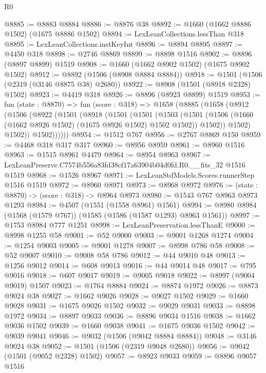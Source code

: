 \begin{lexlean}{R0}
\begin{coremodule}
@8885 := @8883 @8884
@8886 := @8876 @38
@8892 := @1660 (@1662 @8886 @1502) (@1675 @8886 @1502)
@8894 := LexLeanCollections.lessThan @318
@8895 := LexLeanCollections.instKeyInt
@8896 := @8894 @8895
@8897 := @4450 @318
@8898 := @2746 @8869
@8899 := @8898 @1516
@8902 := @8896 (@8897 @8899) @1519
@8908 := @1660 (@1662 @8902 @1502) (@1675 @8902 @1502)
@8912 := @8892 (@1506 (@8908 @8884 @8884))
@8918 := @1501 (@1506 (@2319 (@3146 @8875 @38) @2680))
@8922 := @8908 (@1501 (@8918 @2328) @1502)
@8923 := @4419 @318
@8926 := @8896 (@8923 @8899) @1519
@8953 := fun (state : @8870) =>
  fun (score : @318) =>
  @1658
    (@8885
      (@1658
        (@8912
          (@1506
            (@8922
              (@1501
                (@8918
                  (@1501
                    (@1501
                      (@1503
                        (@1501
                          (@1506 (@1660 (@1662 @8926 @1502) (@1675 @8926 @1502) @1502 @1502))
                          @1502))
                      @1502)
                    @1502))
                @1502))))))
@8954 := @1512 @767
@8956 := @2767 @8869 @150
@8959 := @4468 @318 @317 @317
@8960 := @8956 @8959
@8961 := @8960 @1516
@8963 := @1515 @8961 @4479
@8964 := @8954 @8963
@8967 := LexLeanPreserve.C7574b556a83fd38cf17a63904b04d0fd.R0.__fits_32 @1516 @1519
@8968 := @1526 @8967
@8971 := LexLeanStdModels.Scores.runnerStep @1516 @1519
@8972 := @8960 @8971
@8973 := @8968 @8972
@8976 := (state : @8870) -> (score : @318) -> @8964 @8973
@8980 := @1543 @767 @8963 @8973 @1293
@8984 := @4507 (@1551 (@1558 @8961) @1561)
@8994 := @8980 @8984 (@1568 (@1579 @767)) (@1585 (@1586 (@1587 @1293) @8963 @1561))
@8997 := @1753 @8984 @777 @1251
@8998 := LexLeanPreservation.lessThanE
@9000 := @8998 @1255 @58
@9001 := @52 @9000
@9003 := @9001 @1268 @1274
@9004 := @1254 @9003
@9005 := @9001 @1278
@9007 := @8998 @786 @58
@9008 := @52 @9007
@9010 := @9008 @58 @786
@9012 := @44 @9010 @48
@9013 := @1256 @9012
@9014 := @608 @9013
@9016 := @44 @9014 @48
@9017 := @795 @9016
@9018 := @607 @9017
@9019 := @9005 @9018
@9022 := @8997 (@9004 @9019) @1507
@9023 := @1764 @8884
@9024 := @8874 @1972
@9026 := @8873 @9024 @38
@9027 := @1662 @9026
@9028 := @9027 @1502
@9029 := @1660 @9028
@9031 := @1675 @9026 @1502
@9032 := @9029 @9031
@9033 := @8898 @1972
@9034 := @8897 @9033
@9036 := @8896 @9034 @1516
@9038 := @1662 @9036 @1502
@9039 := @1660 @9038
@9041 := @1675 @9036 @1502
@9042 := @9039 @9041
@9046 := @9032 (@1506 (@9042 @8884 @8884))
@9048 := @3146 @9024 @38
@9052 := @1501 (@1506 (@2319 @9048 @2680))
@9056 := @9042 (@1501 (@9052 @2328) @1502)
@9057 := @8923 @9033
@9059 := @8896 @9057 @1516

\end{coremodule}
\end{lexlean}
